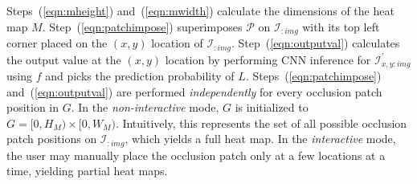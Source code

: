 Steps~(\ref{eqn:mheight}) and~(\ref{eqn:mwidth}) calculate the dimensions of the heat map $M$.
Step~(\ref{eqn:patchimpose}) superimposes $\mathcal{P}$ on $\mathcal{I}_{:img}$ with its top left corner placed on the $(x,y)$ location of $\mathcal{I}_{:img}$.
Step~(\ref{eqn:outputval}) calculates the output value at the $(x,y)$ location by performing CNN inference for $\mathcal{I}^{'}_{x,y:img}$ using $f$ and picks the prediction probability of $L$.
Steps~(\ref{eqn:patchimpose}) and~(\ref{eqn:outputval}) are performed \textit{independently} for every occlusion patch position in $G$.
In the \textit{non-interactive} mode, $G$ is initialized to $G = [0, H_M) \times [0, W_M)$. Intuitively, this represents the set of all possible occlusion patch positions on $\mathcal{I}_{:img}$, which yields a full heat map. In the \textit{interactive} mode, the user may manually place the occlusion patch only at a few locations at a time, yielding partial heat maps.

